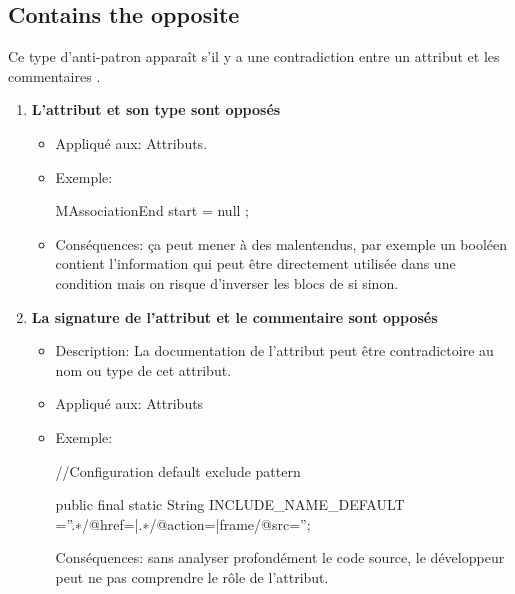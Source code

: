 \subsection{Contains the opposite}
Ce type d'anti-patron apparaît s'il y a une contradiction entre un attribut et les commentaires \cite{arnaoudova2013new}.
\begin{enumerate}
    

\item \textbf{L’attribut et son type sont opposés}
\begin{itemize}
\item Appliqué aux: Attributs.
\item Exemple: 
\begin{framed}

{\selectfont
MAssociationEnd start = null ;
}
\end{framed}
\item Conséquences: ça peut mener à des malentendus, par exemple
un booléen contient l’information qui peut être directement utilisée dans une condition mais on risque d’inverser les blocs de si sinon.
\end{itemize}
\item \textbf{La signature de l’attribut et le commentaire sont opposés}
\begin{itemize}
\item Description: La documentation de l’attribut peut être contradictoire au nom ou type de cet attribut.
\item Appliqué aux: Attributs
\item Exemple: 
\begin{framed}

{\selectfont
//Configuration default exclude pattern \newline

public final static String INCLUDE\_NAME\_DEFAULT
=”.∗/@href=|.∗/@action=|frame/@src=”;

}
\end{framed}
\tem Conséquences: sans analyser profondément le code source, le développeur peut ne pas comprendre le rôle de l’attribut.
\end{itemize}

\end{enumerate}
